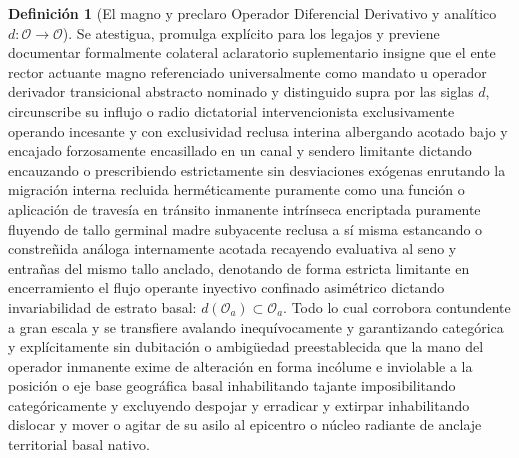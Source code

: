 \documentclass[11pt,a4paper]{article}
\theoremstyle{definition}
\newtheorem{definicion}{Definición}[section]
\theoremstyle{remark}
\numberwithin{equation}{section}
\begin{document}
\begin{definicion}[El magno y preclaro Operador Diferencial Derivativo y analítico $d: \mathcal{O} \to \mathcal{O}$]
Se atestigua, promulga explícito para los legajos y previene documentar formalmente colateral aclaratorio suplementario insigne que el ente rector actuante magno referenciado universalmente como mandato u operador derivador transicional abstracto nominado y distinguido supra por las siglas $d$, circunscribe su influjo o radio dictatorial intervencionista exclusivamente operando incesante y con exclusividad reclusa interina albergando acotado bajo y encajado forzosamente encasillado en un canal y sendero limitante dictando encauzando o prescribiendo estrictamente sin desviaciones exógenas enrutando la migración interna recluida herméticamente puramente como una función o aplicación de travesía en tránsito inmanente intrínseca encriptada puramente fluyendo de tallo germinal madre subyacente reclusa a sí misma estancando o constreñida análoga internamente acotada recayendo evaluativa al seno y entrañas del mismo tallo anclado, denotando de forma estricta limitante en encerramiento el flujo operante inyectivo confinado asimétrico dictando invariabilidad de estrato basal: $d(\mathcal{O}_a) \subset \mathcal{O}_a$. Todo lo cual corrobora contundente a gran escala y se transfiere avalando inequívocamente y garantizando categórica y explícitamente sin dubitación o ambigüedad preestablecida que la mano del operador inmanente exime de alteración en forma incólume e inviolable a la posición o eje base geográfica basal inhabilitando tajante imposibilitando categóricamente y excluyendo despojar y erradicar y extirpar inhabilitando dislocar y mover o agitar de su asilo al epicentro o núcleo radiante de anclaje territorial basal nativo.
\end{definicion}
\end{document}
